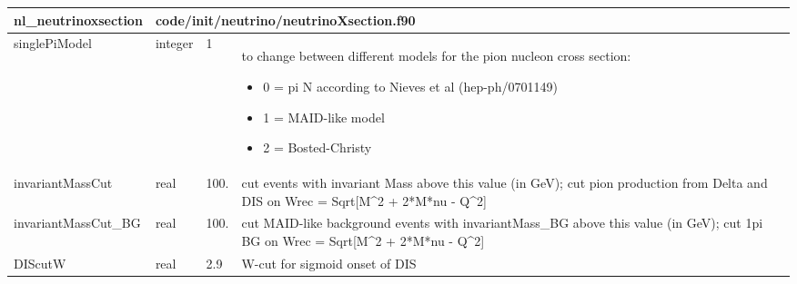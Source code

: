 \documentclass{article}
\begin{document}
\begin{longtable}{llll}
\toprule
\textbf{\large{nl\_neutrinoxsection}} & \multicolumn{3}{l}{\footnotesize{code/init/neutrino/neutrinoXsection.f90}}\\*
\midrule
\endfirsthead
\midrule
\endhead
singlePiModel & \begin{minipage}[t]{2cm}integer\end{minipage} & \begin{minipage}[t]{2cm}1\end{minipage} & \begin{minipage}[t]{12cm}to change between different models for the pion nucleon cross section:\begin{itemize}\leftmargin0em\itemindent0pt\item 0 = pi N according to Nieves et al (hep-ph/0701149)\item 1 = MAID-like model\item 2 = Bosted-Christy\end{itemize}\end{minipage}\\*
\midrule
invariantMassCut & \begin{minipage}[t]{2cm}real\end{minipage} & \begin{minipage}[t]{2cm}100.\end{minipage} & \begin{minipage}[t]{12cm}cut events with invariant Mass above this value (in GeV); cut pion production from Delta and DIS on Wrec = Sqrt[M\^{}2 + 2*M*nu - Q\^{}2]\end{minipage}\\*
\midrule
invariantMassCut\_BG & \begin{minipage}[t]{2cm}real\end{minipage} & \begin{minipage}[t]{2cm}100.\end{minipage} & \begin{minipage}[t]{12cm}cut MAID-like background events with invariantMass\_BG above this value (in GeV); cut 1pi BG on Wrec = Sqrt[M\^{}2 + 2*M*nu - Q\^{}2]\end{minipage}\\*
\midrule
DIScutW & \begin{minipage}[t]{2cm}real\end{minipage} & \begin{minipage}[t]{2cm}2.9\end{minipage} & \begin{minipage}[t]{12cm}W-cut for sigmoid onset of DIS\end{minipage}\\*

\end{longtable}
\end{document}

